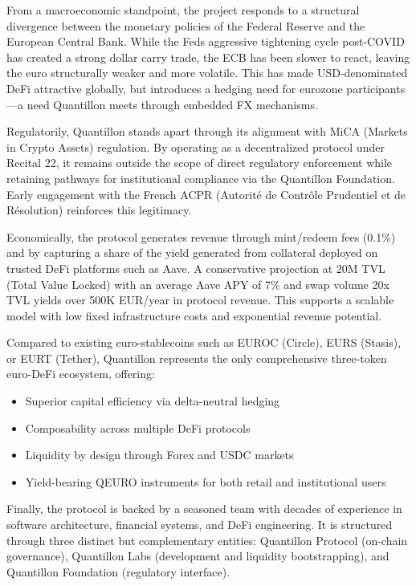 From a macroeconomic standpoint, the project responds to a structural
divergence between the monetary policies of the Federal Reserve and the
European Central Bank. While the Fed\textquotesingle s aggressive
tightening cycle post-COVID has created a strong dollar carry trade, the
ECB has been slower to react, leaving the euro structurally weaker and
more volatile. This has made USD-denominated DeFi attractive globally,
but introduces a hedging need for eurozone participants---a need
Quantillon meets through embedded FX mechanisms.

Regulatorily, Quantillon stands apart through its alignment with MiCA
(Markets in Crypto Assets) regulation. By operating as a decentralized
protocol under Recital 22, it remains outside the scope of direct
regulatory enforcement while retaining pathways for institutional
compliance via the Quantillon Foundation. Early engagement with the
French ACPR (Autorité de Contrôle Prudentiel et de Résolution)
reinforces this legitimacy.

Economically, the protocol generates revenue through mint/redeem fees
(0.1\%) and by capturing a share of the yield generated from collateral
deployed on trusted DeFi platforms such as Aave. A conservative
projection at 20M TVL (Total Value Locked) with an average Aave APY of
7\% and swap volume 20x TVL yields over 500K EUR/year in protocol
revenue. This supports a scalable model with low fixed infrastructure
costs and exponential revenue potential.

Compared to existing euro-stablecoins such as EUROC (Circle), EURS
(Stasis), or EURT (Tether), Quantillon represents the only comprehensive
three-token euro-DeFi ecosystem, offering:

\begin{itemize}
\item
  Superior capital efficiency via delta-neutral hedging
\item
  Composability across multiple DeFi protocols
\item
  Liquidity by design through Forex and USDC markets
\item
  Yield-bearing QEURO instruments for both retail and institutional
  users
\end{itemize}

Finally, the protocol is backed by a seasoned team with decades of
experience in software architecture, financial systems, and DeFi
engineering. It is structured through three distinct but complementary
entities: Quantillon Protocol (on-chain governance), Quantillon Labs
(development and liquidity bootstrapping), and Quantillon Foundation
(regulatory interface).

